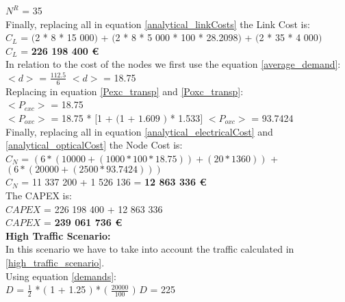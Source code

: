 $N^R$ = 35\\

Finally, replacing all in equation \ref{analytical_linkCosts} the Link Cost is:\\

$C_L$ = $($2 * 8 * 15 000$)$ + $($2 * 8 * 5 000 * 100 * 28.2098$)$ + $($2 * 35 * 4 000$)$\\

$C_L$ = \textbf{226 198 400 \euro}\\

In relation to the cost of the nodes we first use the equation \ref{average_demand}:\\

$<d>$ = $\frac{112.5}{6}$ \qquad \qquad $<d>$ = 18.75\\

Replacing in equation \ref{Pexc_transp} and \ref{Poxc_transp}:\\

$<P_{exc}>$ = 18.75\\

$<P_{oxc}>$ = 18.75 * $[$1 + $($1 + $1.609$ $)$ * 1.533$]$ \qquad \quad $<P_{oxc}>$ = 93.7424 \\

Finally, replacing all in equation \ref{analytical_electricalCost} and \ref{analytical_opticalCost} the Node Cost is:\\

$C_N$ = $\left(6 * (10 000 + (1 000 * 100 * 18.75)) + (20 * 1 360)\right)$ + $\left(6*(20 000 + (2 500 * 93.7424)) \right)$\\

$C_N$ = 11 337 200 + 1 526 136 = \textbf{12 863 336 \euro}\\

The CAPEX is:\\
$CAPEX$ = 226 198 400 + 12 863 336\\

$CAPEX$ = \textbf{239 061 736 \euro}\\


\textbf{High Traffic Scenario:}\\
In this scenario we have to take into account the traffic calculated in \ref{high_traffic_scenario}.\\

Using equation \ref{demands}:\\

$D$ = $\frac{1}{2}$ * $($ 1 + 1.25 $)$ * $($ $\frac{20000}{100}$ $)$ \qquad \qquad $D$ = 225\\

